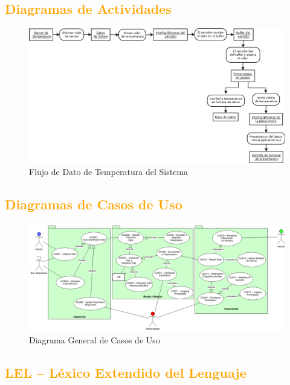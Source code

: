 \subsection{\textcolor{orange}{Diagramas de Actividades}}
\begin{figure}[h!]
 \begin{center}
  \includegraphics[width=1\textwidth,keepaspectratio=true]{img/diagactiv.png}
 \caption{Flujo de Dato de Temperatura del Sistema}
  \label{fig:esquema}
 \end{center}
\end{figure}
\newpage
\subsection{\textcolor{orange}{Diagramas de Casos de Uso}}
\begin{figure}[h!]
 \begin{center}
  \includegraphics[width=1\textwidth,keepaspectratio=true]{img/usecases.png}
  \caption{Diagrama General de Casos de Uso}
  \label{fig:esquema}
 \end{center}
\end{figure}

\subsection{\textcolor{orange}{LEL – Léxico Extendido del Lenguaje}}
	

